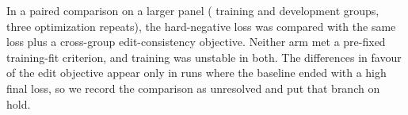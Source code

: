 In a paired comparison on a larger panel (\SSpanelTrainN{} training and \SSpanelDevN{} development
groups, three optimization repeats), the hard-negative loss was compared with the same loss plus a
cross-group edit-consistency objective. Neither arm met a pre-fixed training-fit criterion, and
training was unstable in both. The differences in favour of the edit objective appear only in runs
where the baseline ended with a high final loss, so we record the comparison as unresolved and put
that branch on hold.
